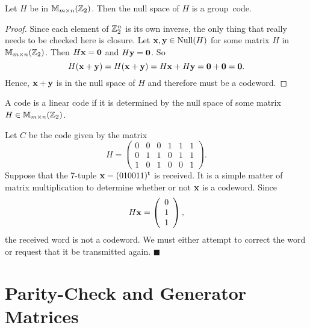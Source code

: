  
\begin{theorem}
Let $H$ be in ${\Bbb M}_{m \times n}({\Bbb Z}_2)$. Then the null space of
$H$ is a group~code. 
\end{theorem}
 
 
\begin{proof}
Since each element of ${\Bbb Z}_2^n$ is its own inverse, the only
thing that really needs to be checked here is closure. Let ${\bold x},
{\bold y} \in {\rm Null}(H)$ for some matrix $H$ in ${\Bbb M}_{m \times
n}({\Bbb Z}_2)$. Then $H{\bold x} = {\bold 0}$ and $H{\bold y} =
{\bold 0}$. So 
\[
H({\bold x}+{\bold y}) = H({\bold x} +{\bold y})
=
H{\bold x} + H{\bold y} = {\bold 0}
+
{\bold 0}
= {\bold 0}.
\]
Hence, ${\bold x}+{\bold y}$ is in the null space of $H$ and
therefore must be a codeword. 
\mbox{\hspace{1in}}
\end{proof}
 
 
\vspace{2ex}
 
 
A code is a {\bfi linear code\/} if it is
determined by the null space of some matrix $H \in {\Bbb M}_{m \times
n}({\Bbb Z}_2)$.  
 
 
\vspace{2ex}
 
 
Let $C$ be the code given by the matrix
\[
H =
\left(
\begin{array}{cccccc}
0 & 0 & 0 & 1 & 1 & 1 \\
0 & 1 & 1 & 0 & 1 & 1 \\
1 & 0 & 1 & 0 & 0 & 1
\end{array}
\right).
\]
Suppose that the 7-tuple ${\bold x} = (010011)^{\rm t}$ is received.
It is a simple matter of matrix multiplication to determine whether or
not ${\bold x}$ is a codeword. Since 
\[
H{\bold x} =
\left(
\begin{array}{c}
0 \\
1 \\
1
\end{array}
\right),
\]
the received word is not a codeword.  We must either attempt to
correct the word or request that it be transmitted again.
\hspace{\fill} $\blacksquare$
 
 
 
\section{Parity-Check and Generator Matrices}
 

